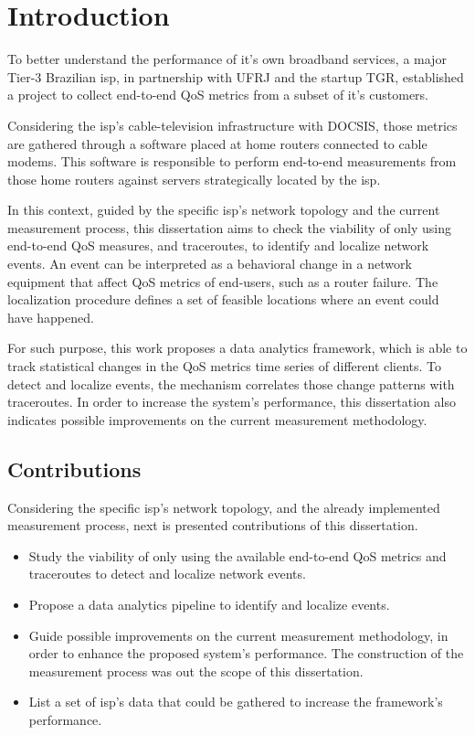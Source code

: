 \chapter{Introduction}

To better understand the performance of it's own broadband services, a major
Tier-3 Brazilian \gls*{isp}, in partnership with UFRJ and the startup TGR,
established a project to collect end-to-end QoS metrics from a subset
of it's customers.

Considering the \gls*{isp}'s cable-television infrastructure with DOCSIS,
those metrics are gathered through a software placed at home routers connected
to cable modems. This software is responsible to perform end-to-end
measurements from those home routers against servers strategically
located by the \gls*{isp}\@.

In this context, guided by the specific \gls*{isp}'s network topology
and the current measurement process,
this dissertation aims to check the viability of
only using end-to-end QoS measures, and traceroutes,
to identify and localize network events. An event can be interpreted as a
behavioral change in a network equipment that affect QoS metrics of end-users,
such as a router failure. The localization procedure defines a set of
feasible locations where an event could have happened.

For such purpose, this work proposes a data analytics framework, which is able
to track statistical changes in the QoS metrics time series of different
clients.
To detect and localize events, the mechanism correlates those change
patterns with traceroutes.
In order to increase the system's performance,
this dissertation also indicates possible improvements on the current
measurement methodology.

\section{Contributions}

Considering the specific \gls*{isp}'s network topology, and the already implemented
measurement process, next is presented contributions of this dissertation.

\begin{itemize}
\item
Study the viability of only using the available end-to-end QoS metrics and
traceroutes to detect and localize network events.

\item Propose a data analytics pipeline to identify and localize events.

\item Guide possible improvements on the current measurement methodology,
in order to enhance the proposed system's performance. The construction
of the measurement process was out the scope of this dissertation.

\item List a set of \gls*{isp}'s data that could be gathered to increase the
framework's performance.

\end{itemize}

